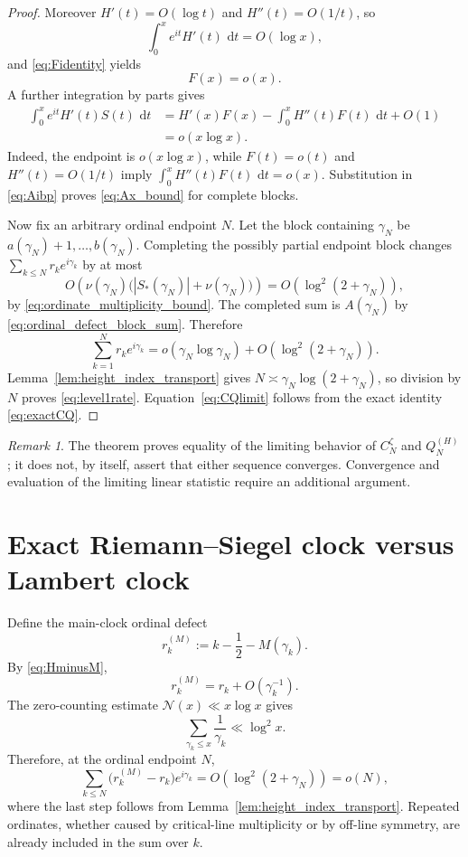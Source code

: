 \documentclass[11pt]{amsart}
\numberwithin{equation}{section}
\theoremstyle{definition}
\theoremstyle{remark}
\newtheorem{remark}[theorem]{Remark}
\newcommand{\dd}{\,\mathrm d}
\begin{document}
\begin{proof}
Moreover \(H'(t)=O(\log t)\) and \(H''(t)=O(1/t)\), so
\[
\int_0^x e^{it}H'(t)\,\dd t=O(\log x),
\]
and \eqref{eq:Fidentity} yields
\begin{equation}\label{eq:Fbound}
F(x)=o(x).
\end{equation}
A further integration by parts gives
\begin{align}
\int_0^x e^{it}H'(t)S(t)\,\dd t
&=H'(x)F(x)-\int_0^x H''(t)F(t)\,\dd t+O(1)\\
&=o(x\log x).
\end{align}
Indeed, the endpoint is \(o(x\log x)\), while \(F(t)=o(t)\) and \(H''(t)=O(1/t)\) imply \(\int_0^xH''(t)F(t)\,\dd t=o(x)\). Substitution in \eqref{eq:Aibp} proves \eqref{eq:Ax_bound} for complete blocks.

Now fix an arbitrary ordinal endpoint \(N\). Let the block containing \(\gamma_N\) be \(a(\gamma_N)+1,\ldots,b(\gamma_N)\). Completing the possibly partial endpoint block changes \(\sum_{k\le N}r_ke^{i\gamma_k}\) by at most
\begin{equation}\label{eq:partial_block_level1_error}
O\!\left(\nu(\gamma_N)\bigl(|S_*(\gamma_N)|+\nu(\gamma_N)\bigr)\right)
=O(\log^2(2+\gamma_N)),
\end{equation}
by \eqref{eq:ordinate_multiplicity_bound}. The completed sum is \(A(\gamma_N)\) by \eqref{eq:ordinal_defect_block_sum}. Therefore
\[
\sum_{k=1}^N r_ke^{i\gamma_k}
=o(\gamma_N\log\gamma_N)+O(\log^2(2+\gamma_N)).
\]
Lemma~\ref{lem:height_index_transport} gives \(N\asymp\gamma_N\log(2+\gamma_N)\), so division by \(N\) proves \eqref{eq:level1rate}. Equation~\eqref{eq:CQlimit} follows from the exact identity \eqref{eq:exactCQ}.
\end{proof}

\begin{remark}
The theorem proves equality of the limiting behavior of $C_N^{\zeta}$ and $Q_N^{(H)}$; it does not, by itself, assert that either sequence converges. Convergence and evaluation of the limiting linear statistic require an additional argument.
\end{remark}

\section{Exact Riemann--Siegel clock versus Lambert clock}\label{sec:clockequiv}

Define the main-clock ordinal defect
\begin{equation}\label{eq:rM_definition}
r_k^{(M)}:=k-\frac12-M(\gamma_k).
\end{equation}
By \eqref{eq:HminusM},
\[
r_k^{(M)}=r_k+O(\gamma_k^{-1}).
\]
The zero-counting estimate $\mathcal N(x)\ll x\log x$ gives
\[
\sum_{\gamma_k\le x}\frac1{\gamma_k}\ll\log^2x.
\]
Therefore, at the ordinal endpoint $N$,
\begin{equation}\label{eq:HMphase}
\sum_{k\le N}
\bigl(r_k^{(M)}-r_k\bigr)e^{i\gamma_k}
=O(\log^2(2+\gamma_N))=o(N),
\end{equation}
where the last step follows from Lemma~\ref{lem:height_index_transport}. Repeated ordinates, whether caused by critical-line multiplicity or by off-line symmetry, are already included in the sum over $k$.
\end{document}

